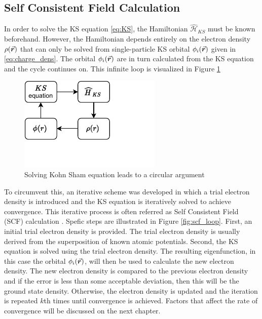 \subsection{Self Consistent Field Calculation}
In order to solve the KS equation \eqref{eq:KS}, the Hamiltonian $\hat{\mathcal{H}}_{KS}$ must be known beforehand. However, the Hamiltonian depends entirely  on the electron density $\rho({\va*{r}})$ that can only be  solved from single-particle KS orbital $\phi_i(\va*{r})$ given in \eqref{eq:charge_dens}. The orbital $\phi_i(\va*{r})$ are in turn calculated from the KS equation and the cycle continues on. This infinite loop is visualized in Figure \ref{fig:KS_loop}

\begin{figure}[tbh!]
	\centering
	\includegraphics[width=0.3\linewidth]{"images/KS_loop"}
	\caption[Kohn Sham loop]{Solving Kohn Sham equation leads to a circular argument}
	\label{fig:KS_loop}
\end{figure}

To circumvent this, an iterative scheme was developed  in which a trial electron density is introduced and the KS equation is iteratively solved  to achieve convergence. This iterative process is often referred as Self Consistent Field (SCF) calculation \citep{Woods2019}. Spefic steps are illustrated in Figure \ref{fig:scf_loop}. First, an initial trial electron density is provided. The trial electron density is usually derived from the superposition of known atomic potentials. Second,    the KS equation is solved using the trial electron density. The resulting eigenfunction, in this case the orbital $\phi_i(\va*{r})$, will then be used to calculate the new electron density. The new electron density is compared to the previous electron density and if the error is less than some acceptable deviation, then this will be the ground state density. Otherwise, the electron density is updated and the iteration is repeated $k$th times until convergence is achieved. Factors that affect the rate of convergence will be discussed on the next chapter. 

